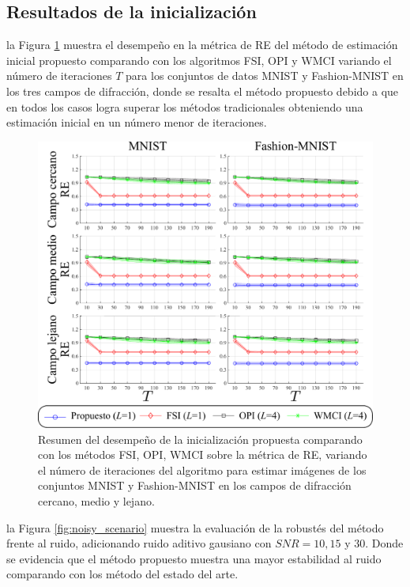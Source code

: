 \subsection{Resultados de la inicialización}


la Figura \ref{fig:results_initializations} muestra el desempeño en la métrica de RE del método de estimación inicial propuesto  comparando con los algoritmos FSI, OPI y WMCI variando el número de iteraciones $T$ para los conjuntos de datos MNIST y Fashion-MNIST en los tres campos de difracción, donde se resalta el método propuesto debido a que en todos los casos logra superar los métodos tradicionales obteniendo una estimación inicial en un número menor de iteraciones.

\begin{figure}[h!]
\centering
         \includegraphics[width=0.8\linewidth]{images/results_initializations.pdf}
        \caption{Resumen del desempeño de la inicialización propuesta comparando con los métodos FSI, OPI, WMCI sobre la métrica de RE, variando el número de iteraciones del algoritmo para estimar imágenes de los conjuntos MNIST y Fashion-MNIST en los campos de difracción cercano, medio y lejano.}
        \label{fig:results_initializations}
\end{figure}



la Figura \ref{fig:noisy_scenario} muestra la evaluación de la robustés del método frente al ruido, adicionando ruido aditivo gausiano con $SNR = 10, 15$ y $30$. Donde se evidencia que el método propuesto muestra una mayor estabilidad al ruido comparando con los método del estado del arte.

